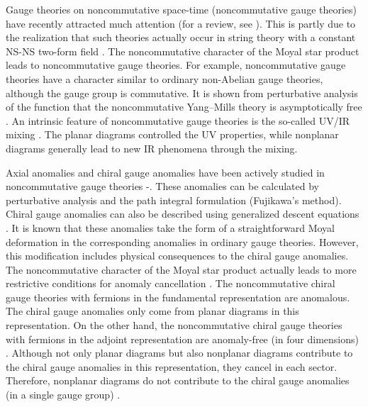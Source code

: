 \documentclass[a4paper,12pt]{article}
\begin{document}
Gauge theories on noncommutative space-time (noncommutative gauge theories) 
have recently attracted much attention (for a review, see \cite{MRDNAN}). 
This is partly due to the realization that such theories actually occur in 
string theory with a constant NS-NS two-form field \cite{NSEW}. 
The noncommutative character of the Moyal star product leads to 
noncommutative gauge theories. For example, noncommutative \coordHE{} gauge 
theories have a character similar to ordinary non-Abelian gauge theories, 
although the gauge group is commutative. It is shown from perturbative 
analysis of the \myHighlight{$\beta$}\coordHE{} function that the noncommutative \coordHE{} Yang--Mills 
theory is asymptotically free \cite{CPMDSR, SMMVR}. 
An intrinsic feature of noncommutative gauge theories is 
the so-called UV/IR mixing \cite{SMMVR}. The planar diagrams controlled the UV 
properties, while nonplanar diagrams generally lead to new IR phenomena 
through the mixing. 


Axial anomalies and chiral gauge anomalies have been actively studied in 
noncommutative gauge theories \cite{FANS0}-\cite{KIJK}. These 
anomalies can be calculated by perturbative analysis and the path integral 
formulation (Fujikawa's method). Chiral gauge anomalies can also be described 
using generalized descent equations \cite{LBMSAT}. It is known that these 
anomalies take the form of a straightforward Moyal deformation in the 
corresponding anomalies in ordinary gauge theories. However, this 
modification includes physical consequences 
to the chiral gauge anomalies. The noncommutative character of the Moyal star 
product actually leads to more restrictive conditions for anomaly 
cancellation \cite{JMGBCPM, LBMSAT}. The noncommutative chiral gauge 
theories with fermions in the fundamental representation 
are anomalous. The chiral gauge anomalies only come from planar diagrams in 
this representation. 
On the other hand, the noncommutative chiral gauge theories with fermions in 
the adjoint representation are anomaly-free (in four dimensions) 
\cite{CPM, FANS, JNMA}.  
Although not only planar diagrams but also nonplanar diagrams contribute to 
the chiral gauge anomalies in this representation, they cancel in each sector. 
Therefore, nonplanar diagrams do not contribute to the chiral gauge 
anomalies (in a single gauge group) \cite{CPM, KIJK}. 
\end{document}
